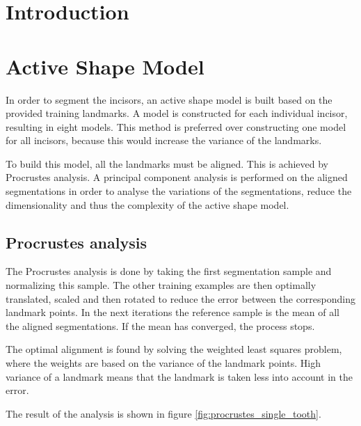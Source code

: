 \documentclass[a4paper,10pt]{article}
\begin{document}

\tableofcontents

\section{Introduction}

\clearpage
\section{Active Shape Model}
In order to segment the incisors, an active shape model is built based on the provided training landmarks. A model is constructed for each individual incisor, resulting in eight models. This method is preferred over constructing one model for all incisors, because this would increase the variance of the landmarks.

To build this model, all the landmarks must be aligned. This is achieved by Procrustes analysis. A principal component analysis is performed on the aligned segmentations in order to analyse the variations of the segmentations, reduce the dimensionality and thus the complexity of the active shape model.
\subsection{Procrustes analysis}
The Procrustes analysis is done by taking the first segmentation sample and normalizing this sample. The other training examples are then optimally translated, scaled and then rotated to reduce the error between the corresponding landmark points. In the next iterations the reference sample is the mean of all the aligned segmentations. If the mean has converged, the process stops.

The optimal alignment is found by solving the weighted least squares problem, where the weights are based on the variance of the landmark points. High variance of a landmark means that the landmark is taken less into account in the error.

The result of the analysis is shown in figure \ref{fig:procrustes_single_tooth}.
\end{document}
